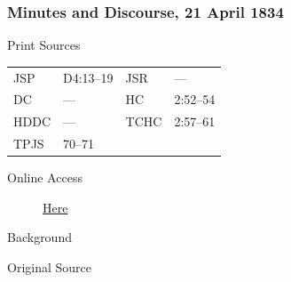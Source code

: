 		\subsubsection{Minutes and Discourse, 21 April 1834}
			\label{EMS-1834-JS-21-APR-1834}
			
			\begin{description}
					\item[Print Sources]
				\end{description}

					\begin{tabular}{p{0.5in}p{1in}p{0.5in}p{1in}}
					JSP	 	& D4:13--19		& JSR 		& --- \\
					DC	 	& --- 		& HC 		& 2:52--54 \\
					HDDC 	& ---		& TCHC 		& 2:57--61 \\
					TPJS 	& 70--71			& 	 		&  \\
					\end{tabular}
				
				\begin{description}
					\item[Online Access] \href{https://www.josephsmithpapers.org/paper-summary/minutes-and-discourse-21-april-1834/1}{Here}
				\end{description}
				
				\begin{description}
					\item[Background]
				\end{description}
				
				
				\begin{description}
					\item[Original Source]
				\end{description}
				
				
